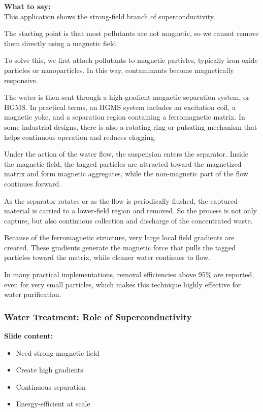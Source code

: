 \documentclass[11pt,a4paper]{article}
\newcommand{\points}[1]{{\color{accent}\textbf{Slide content:}}\\#1}
\newcommand{\speech}[1]{{\color{accent}\textbf{What to say:}}\\#1}
\begin{document}
\speech{
This application shows the strong-field branch of superconductivity.

The starting point is that most pollutants are not magnetic, so we cannot remove them directly using a magnetic field.

To solve this, we first attach pollutants to magnetic particles, typically iron oxide particles or nanoparticles. In this way, contaminants become magnetically responsive.

The water is then sent through a high-gradient magnetic separation system, or HGMS. In practical terms, an HGMS system includes an excitation coil, a magnetic yoke, and a separation region containing a ferromagnetic matrix. In some industrial designs, there is also a rotating ring or pulsating mechanism that helps continuous operation and reduces clogging.

Under the action of the water flow, the suspension enters the separator. Inside the magnetic field, the tagged particles are attracted toward the magnetized matrix and form magnetic aggregates, while the non-magnetic part of the flow continues forward.

As the separator rotates or as the flow is periodically flushed, the captured material is carried to a lower-field region and removed. So the process is not only capture, but also continuous collection and discharge of the concentrated waste.

Because of the ferromagnetic structure, very large local field gradients are created. These gradients generate the magnetic force that pulls the tagged particles toward the matrix, while cleaner water continues to flow.

In many practical implementations, removal efficiencies above 95\% are reported, even for very small particles, which makes this technique highly effective for water purification.
}


\subsubsection{Water Treatment: Role of Superconductivity}

\points{
\begin{itemize}
\item Need strong magnetic field
\item Create high gradients
\item Continuous separation
\item Energy-efficient at scale
\end{itemize}
}
\end{document}
